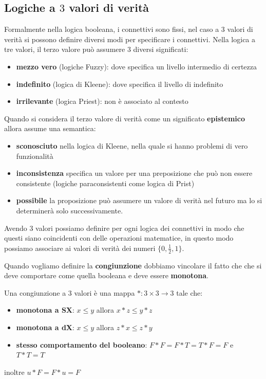 \subsection{Logiche a $3$ valori di verità}
Formalmente nella logica booleana, i connettivi sono fissi, nel caso a $3$ valori di verità 
si possono definire diversi modi per specificare i connettivi. Nella logica a 
tre valori, il terzo valore può assumere $3$ diversi significati:
\begin{itemize}
    \item \textbf{mezzo vero} (logiche Fuzzy): dove specifica un livello intermedio di certezza
    \item \textbf{indefinito} (logica di Kleene): dove specifica il livello di 
    indefinito
    \item \textbf{irrilevante} (logica Priest): non è associato al contesto
\end{itemize}

Quando si considera il terzo valore di verità come un significato \textbf{epistemico}
allora assume una semantica:
\begin{itemize}
    \item \textbf{sconosciuto} nella logica di Kleene, nella quale si hanno problemi 
    di vero funzionalità
    \item \textbf{inconsistenza} specifica un valore per una preposizione che può
    non essere consistente (logiche paraconsistenti come logica di Prist)
    \item \textbf{possibile} la proposizione può assumere un valore di verità 
    nel futuro ma lo si determinerà solo successivamente.
\end{itemize}

Avendo $3$ valori possiamo definire per ogni logica dei connettivi in modo che questi 
siano coincidenti con delle operazioni matematice, in questo modo possiamo associare 
ai valori di verità dei numeri $\{0,\frac{1}{2},1\}$.

Quando vogliamo definire la \textbf{congiunzione} dobbiamo vincolare il fatto che 
che si deve comportare come quella booleana e deve essere \textbf{monotona}.

\begin{definizione}
    Una congiunzione a $3$ valori è una mappa $\ast:3\times 3\to 3$ tale che:
    \begin{itemize}
        \item \textbf{monotona a SX}: $x\le y$ allora $x\ast z\le y\ast z$ 
        \item \textbf{monotona a dX}: $x\le y$ allora $z\ast x\le z\ast y$ 
        \item \textbf{stesso comportamento del booleano}: $F\ast F=F\ast T = T\ast F = F$ e $T\ast T = T$
    \end{itemize}
    inoltre $u\ast F = F \ast u = F$
\end{definizione}

